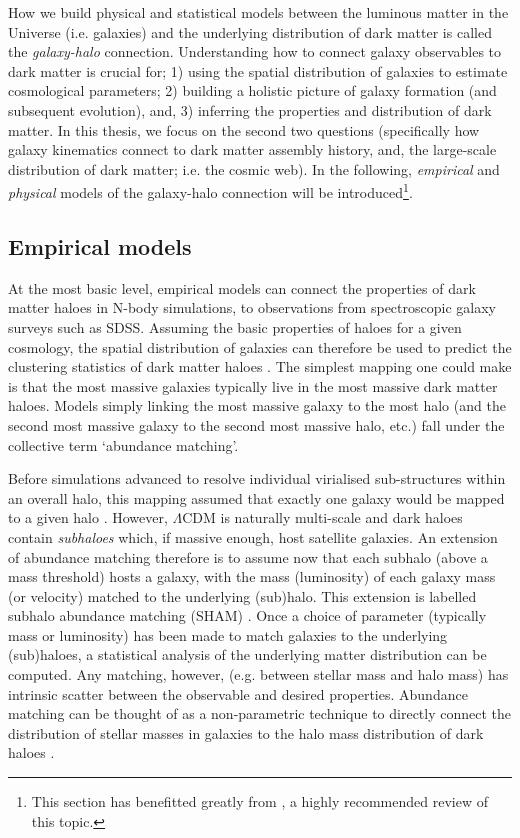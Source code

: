 How we build physical and statistical models between the luminous matter in the Universe (i.e. galaxies) and the underlying distribution of dark matter is called the \textit{galaxy-halo} connection. Understanding how to connect galaxy observables to dark matter is crucial for; 1) using the spatial distribution of galaxies to estimate cosmological parameters; 2) building a holistic picture of galaxy formation (and subsequent evolution), and, 3) inferring the properties and distribution of dark matter. In this thesis, we focus on the second two questions (specifically how galaxy kinematics connect to dark matter assembly history, and, the large-scale distribution of dark matter; i.e. the cosmic web). In the following, \textit{empirical} and \textit{physical} models of the galaxy-halo connection will be introduced\footnote{This section has benefitted greatly from \citet{wechsler2018}, a highly recommended review of this topic.}. 

\subsection{Empirical models}
At the most basic level, empirical models can connect the properties of dark matter haloes in N-body simulations, to observations from spectroscopic galaxy surveys such as SDSS. Assuming the basic properties of haloes for a given cosmology, the spatial distribution of galaxies can therefore be used to predict the clustering statistics of dark matter haloes \citep[for example][]{mo1996, sheth1999}. The simplest mapping one could make is that the most massive galaxies typically live in the most massive dark matter haloes. Models simply linking the most massive galaxy to the most halo (and the second most massive galaxy to the second most massive halo, etc.) fall under the collective term `abundance matching'. 

Before simulations advanced to resolve individual virialised sub-structures within an overall halo, this mapping assumed that exactly one galaxy would be mapped to a given halo \citep[e.g.][]{wechsler1998, moustakas2002}. However, $\Lambda$CDM is naturally multi-scale and dark haloes contain \textit{subhaloes} which, if massive enough, host satellite galaxies. An extension of abundance matching therefore is to assume now that each subhalo (above a mass threshold) hosts a galaxy, with the mass (luminosity) of each galaxy mass (or velocity) matched to the underlying (sub)halo. This extension is labelled subhalo abundance matching (SHAM) \citep[e.g.][]{vale2004, kravtsov2004, conroy2006}. Once a choice of parameter (typically mass or luminosity) has been made to match galaxies to the underlying (sub)haloes, a statistical analysis of the underlying matter distribution can be computed. Any matching, however, (e.g. between stellar mass and halo mass) has intrinsic scatter between the observable and desired properties. Abundance matching can be thought of as a non-parametric technique to directly connect the distribution of stellar masses in galaxies to the halo mass distribution of dark haloes \citep[][]{tasitsiomi2004}. 

